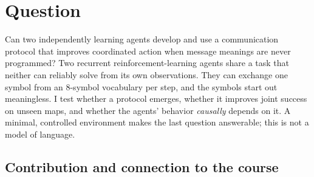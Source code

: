 \begin{abstract}

This project tests whether independently trained recurrent agents can
learn useful message meanings in a task with complementary private
information. A scout knows the target and a runner must collect it, with
the target hidden from the runner and a wall blocking physical
interaction. I adapt independent PPO with a cue-directed
positive-signalling objective, without assigning symbols to targets or
adding a listener-specific loss. Across 20 seeds per condition, discrete
communication reaches 87.6\% (95\% CI 86.3--88.6) held-out success, with
a +65.0 pp (95\% CI +63.5 to +66.3) advantage over no communication. A
message-permutation intervention removes +67.6 pp (95\% CI +66.0 to
+69.1), distinguishing informative speech from actual listener use. A
separately pre-registered extension introduces two-word messages and
color--shape targets. It supports communication on seen combinations but
fails the frozen generalization criterion. A continuous vocal channel
provides an exploratory comparison. The contribution is a controlled,
reproducible test of a task-specific signalling modification and the
limits of the resulting protocols, rather than a claim that symbolic
communication or positive signalling is new.

\end{abstract}

\section{Question}\label{question}

Can two independently learning agents develop and use a communication
protocol that improves coordinated action when message meanings are
never programmed? Two recurrent reinforcement-learning agents share a
task that neither can reliably solve from its own observations. They can
exchange one symbol from an 8-symbol vocabulary per step, and the
symbols start out meaningless. I test whether a protocol emerges,
whether it improves joint success on unseen maps, and whether the
agents' behavior \emph{causally} depends on it. A minimal, controlled
environment makes the last question answerable; this is not a model of
language.

\subsection{Contribution and connection to the
course}\label{contribution-and-connection-to-the-course}

